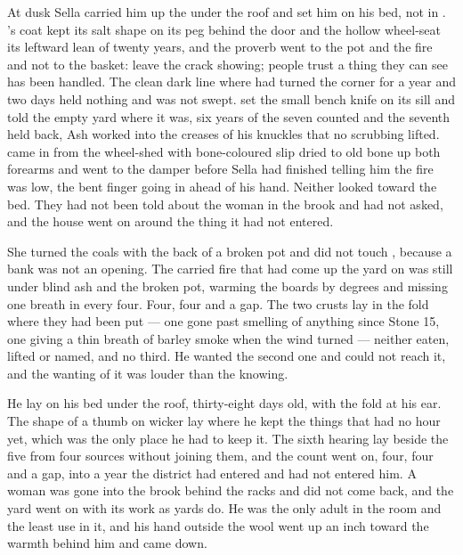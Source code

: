 At dusk Sella carried him up the  under the  roof and set him on his bed, not in . 's coat kept its salt shape on its peg behind the door and the hollow wheel-seat its leftward lean of twenty years, and the proverb went to the pot and the fire and not to the basket: leave the crack showing; people trust a thing they can see has been handled. The clean dark line where  had turned the corner for a year and two days held nothing and was not swept.  set the small bench knife on its sill and told the empty yard where it was, six years of the seven counted and the seventh held back, Ash worked into the creases of his knuckles that no scrubbing lifted.  came in from the wheel-shed with bone-coloured slip dried to old bone up both forearms and went to the damper before Sella had finished telling him the fire was low, the bent finger going in ahead of his hand. Neither looked toward the bed. They had not been told about the woman in the brook and had not asked, and the house went on around the thing it had not entered.

She turned the coals with the back of a broken pot and did not touch , because a bank was not an opening. The carried fire that had come up the yard on  was still under blind ash and the broken pot, warming the boards by degrees and missing one breath in every four. Four, four and a gap. The two crusts lay in the fold where they had been put --- one gone past smelling of anything since Stone 15, one giving a thin breath of barley smoke when the wind turned --- neither eaten, lifted or named, and no third. He wanted the second one and could not reach it, and the wanting of it was louder than the knowing.

He lay on his bed under the roof, thirty-eight days old, with the fold at his ear. The shape of a thumb on wicker lay where he kept the things that had no hour yet, which was the only place he had to keep it. The sixth hearing lay beside the five from four sources without joining them, and the count went on, four, four and a gap, into a year the district had entered and had not entered him. A woman was gone into the brook behind the racks and did not come back, and the yard went on with its work as yards do. He was the only adult in the room and the least use in it, and his hand outside the wool went up an inch toward the warmth behind him and came down.
